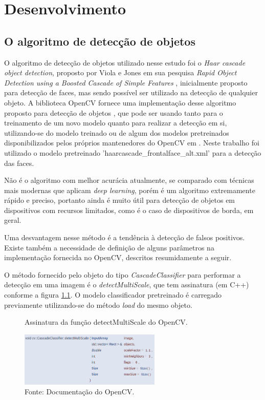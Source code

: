 \chapter{Desenvolvimento}
\thispagestyle{plain}
\label{cap:desenvolvimento}
\graphicspath{{./Cap3_Desenvolvimento/Figures/}}

\section{O algoritmo de detecção de objetos}

O algoritmo de detecção de objetos utilizado nesse estudo foi o \textit{Haar cascade object detection}, proposto por Viola e Jones em sua pesquisa \textit{Rapid Object Detection using a Boosted Cascade of Simple Features} \cite{Viola2001}, inicialmente proposto para detecção de faces, mas sendo possível ser utilizado na detecção de qualquier objeto. A biblioteca OpenCV fornece uma implementação desse algoritmo proposto para detecção de objetos \cite{OpenCV-CascadeClassifier}, que pode ser usando tanto para o treinamento de um novo modelo quanto para realizar a detecção em si, utilizando-se do modelo treinado ou de algum dos modelos pretreinados disponibilizados pelos próprios mantenedores do OpenCV em \cite{OpenCV-PreTrainedModels}. Neste trabalho foi utilizado o modelo pretreinado 'haarcascade\_frontalface\_alt.xml' para a detecção das faces. 

Não é o algoritmo com melhor acurácia atualmente, se comparado com técnicas mais modernas que aplicam \textit{deep learning}, porém é um algoritmo extremamente rápido e preciso, portanto ainda é muito útil para detecção de objetos em dispositivos com recursos limitados, como é o caso de dispositivos de borda, em geral.

Uma desvantagem nesse método é a tendência à detecção de falsos positivos. Existe também a necessidade de definição de alguns parâmetros na implementação fornecida no OpenCV, descritos resumidamente a seguir.

O método fornecido pelo objeto do tipo \emph{CascadeClassifier} \cite{OpenCV-CascadeClassifier} para performar a detecção em uma imagem é o \emph{detectMultiScale}, que tem assinatura (em C++) conforme a figura \ref{fig:detectMultiScaleFcn}. O modelo classificador pretreinado é carregado previamente utilizando-se do método \emph{load} do mesmo objeto.

\begin{figure}[H]
    \centering
    \caption[Assinatura da função detectMultiScale do OpenCV.]{Assinatura da função detectMultiScale do OpenCV.}
    \includegraphics[width=0.60\textwidth]{Cap3_Desenvolvimento/Figures/detectMultiScaleFcn.jpg}
    \caption*{Fonte: Documentação do OpenCV.\footnotemark}
    \label{fig:detectMultiScaleFcn}
\end{figure}

